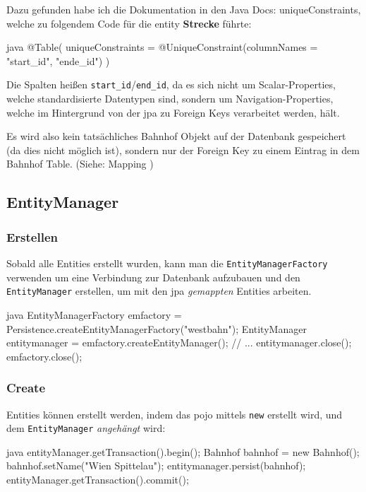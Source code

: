 Dazu gefunden habe ich die Dokumentation in den Java Docs: \gls{uniqueConstraints}, welche zu folgendem Code für die \gls{entity} \textbf{Strecke} führte:

\begin{code}{java}
@Table(
        uniqueConstraints = @UniqueConstraint(columnNames = {"start_id", "ende_id"})
)
\end{code}

Die Spalten heißen \texttt{start\_id}/\texttt{end\_id}, da es sich nicht um Scalar-Properties, welche standardisierte Datentypen sind, sondern um Navigation-Properties, welche im Hintergrund von der \gls{jpa} zu Foreign Keys verarbeitet werden, hält.

Es wird also kein tatsächliches Bahnhof Objekt auf der Datenbank gespeichert (da dies nicht möglich ist), sondern nur der Foreign Key zu einem Eintrag in dem Bahnhof Table. (Siehe: Mapping \cite{wiki:mapping})

\clearpage
\subsection{EntityManager}

\subsubsection{Erstellen}

Sobald alle Entities erstellt wurden, kann man die \texttt{EntityManagerFactory} \cite{jdoc:entityManagerFactory} verwenden um eine Verbindung zur Datenbank aufzubauen und den \texttt{EntityManager} \cite{jdoc:entityManager} erstellen, um mit den \gls{jpa} \textit{gemappten} Entities arbeiten.

\begin{code}{java}
EntityManagerFactory emfactory = Persistence.createEntityManagerFactory("westbahn");
EntityManager entitymanager = emfactory.createEntityManager();
// ...
entitymanager.close();
emfactory.close();
\end{code}

\subsubsection{Create}

Entities können erstellt werden, indem das \gls{pojo} mittels \texttt{new} erstellt wird, und dem \texttt{EntityManager} \textit{angehängt} wird:

\begin{code}{java}
entityManager.getTransaction().begin();
Bahnhof bahnhof = new Bahnhof();
bahnhof.setName("Wien Spittelau");
entitymanager.persist(bahnhof);
entityManager.getTransaction().commit();
\end{code}

